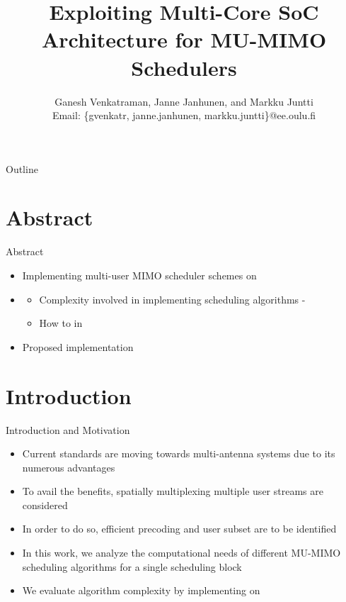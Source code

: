 \documentclass[11pt]{beamer}
\title{Exploiting Multi-Core SoC Architecture for \acs{MU-MIMO} Schedulers}
\author{{Ganesh Venkatraman, Janne Janhunen, and Markku Juntti} \\ \scriptsize{Email: \{gvenkatr, janne.janhunen, markku.juntti\}@ee.oulu.fi}}
\begin{document}
\begin{frame}
    \titlepage
\end{frame}

\begin{frame}{Outline} \scriptsize
    \tableofcontents
\end{frame}

  

\section{Abstract}

\begin{frame}{Abstract}
	\begin{itemize}
		\item {} Implementing multi-user MIMO scheduler schemes on 
		\item {}
			\begin{itemize}
				\item Complexity involved in implementing scheduling algorithms - 
				\item How to  in 
			\end{itemize}
		\item {} Proposed implementation 
	\end{itemize}
\end{frame}

\section{Introduction}

\begin{frame}{Introduction and Motivation}
\begin{itemize}
\item Current standards are moving towards multi-antenna systems due to its numerous advantages
\item To avail the benefits, spatially multiplexing multiple user streams are considered
\item In order to do so, efficient precoding and user subset are to be identified
\item In this work, we analyze the computational needs of different MU-MIMO scheduling algorithms for a single scheduling block
\item We evaluate algorithm complexity by implementing on 
\end{itemize}
\end{frame}
\end{document}
